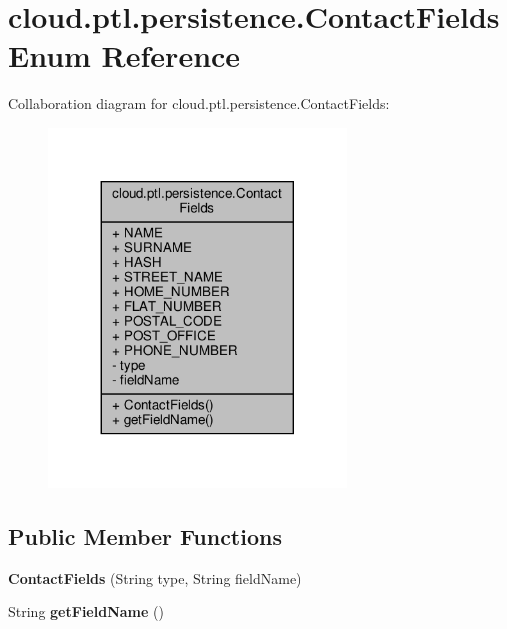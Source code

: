 \hypertarget{enumcloud_1_1ptl_1_1persistence_1_1ContactFields}{}\section{cloud.\+ptl.\+persistence.\+Contact\+Fields Enum Reference}
\label{enumcloud_1_1ptl_1_1persistence_1_1ContactFields}


Collaboration diagram for cloud.\+ptl.\+persistence.\+Contact\+Fields\+:
\nopagebreak
\begin{figure}[H]
\begin{center}
\leavevmode
\includegraphics[width=224pt]{enumcloud_1_1ptl_1_1persistence_1_1ContactFields__coll__graph}
\end{center}
\end{figure}
\subsection*{Public Member Functions}
\begin{DoxyCompactItemize}
\item 
\mbox{\label{enumcloud_1_1ptl_1_1persistence_1_1ContactFields_ae64d692f1ab9f31b752f901075d3e7b8}} 
{\bfseries Contact\+Fields} (String type, String field\+Name)
\item 
\mbox{\label{enumcloud_1_1ptl_1_1persistence_1_1ContactFields_ab08b7b43a8aedb74b26be8de52087a20}} 
String {\bfseries get\+Field\+Name} ()
\end{DoxyCompactItemize}
